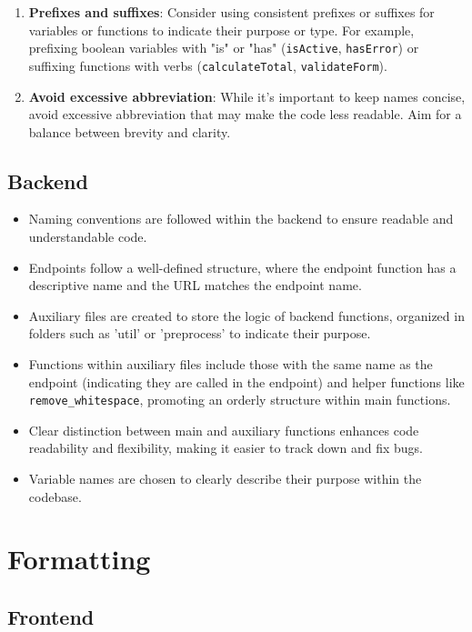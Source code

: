 \documentclass[12pt]{article}
\begin{document}
\begin{enumerate}
    \item \textbf{Prefixes and suffixes}: Consider using consistent prefixes or suffixes for variables or functions to indicate their purpose or type. For example, prefixing boolean variables with "is" or "has" (\texttt{isActive}, \texttt{hasError}) or suffixing functions with verbs (\texttt{calculateTotal}, \texttt{validateForm}).
    
    \item \textbf{Avoid excessive abbreviation}: While it's important to keep names concise, avoid excessive abbreviation that may make the code less readable. Aim for a balance between brevity and clarity.
\end{enumerate}

\subsection{Backend}
\begin{itemize}
    \item Naming conventions are followed within the backend to ensure readable and understandable code.
    \item Endpoints follow a well-defined structure, where the endpoint function has a descriptive name and the URL matches the endpoint name.
    \item Auxiliary files are created to store the logic of backend functions, organized in folders such as 'util' or 'preprocess' to indicate their purpose.
    \item Functions within auxiliary files include those with the same name as the endpoint (indicating they are called in the endpoint) and helper functions like \texttt{remove\_whitespace}, promoting an orderly structure within main functions.
    \item Clear distinction between main and auxiliary functions enhances code readability and flexibility, making it easier to track down and fix bugs.
    \item Variable names are chosen to clearly describe their purpose within the codebase.
\end{itemize}

\newpage
\section{Formatting}
\subsection{Frontend}
\end{document}

